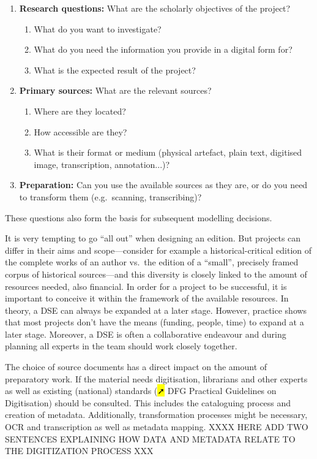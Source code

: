 \documentclass[
  letterpaper,
  DIV=11,
  numbers=noendperiod]{scrreprt}
\begin{document}
\begin{enumerate}
\def\labelenumi{\arabic{enumi}.}
\item
  \textbf{Research questions:} What are the scholarly objectives of the
  project?

  \begin{enumerate}
  \def\labelenumii{\alph{enumii}.}
  \item
    What do you want to investigate?
  \item
    What do you need the information you provide in a digital form for?
  \item
    What is the expected result of the project?
  \end{enumerate}
\item
  \textbf{Primary sources:} What are the relevant sources?

  \begin{enumerate}
  \def\labelenumii{\alph{enumii}.}
  \item
    Where are they located?
  \item
    How accessible are they?
  \item
    What is their format or medium (physical artefact, plain text,
    digitised image, transcription, annotation...)?
  \end{enumerate}
\item
  \textbf{Preparation:} Can you use the available sources as they are,
  or do you need to transform them (e.g.~scanning, transcribing)?
\end{enumerate}

These questions also form the basis for subsequent modelling decisions.

It is very tempting to go ``all out'' when designing an edition. But
projects can differ in their aims and scope---consider for example a
historical-critical edition of the complete works of an author vs.~the
edition of a ``small'', precisely framed corpus of historical
sources---and this diversity is closely linked to the amount of
resources needed, also financial. In order for a project to be
successful, it is important to conceive it within the framework of the
available resources. In theory, a DSE can always be expanded at a later
stage. However, practice shows that most projects don't have the means
(funding, people, time) to expand at a later stage. Moreover, a DSE is
often a collaborative endeavour and during planning all experts in the
team should work closely together.

The choice of source documents has a direct impact on the amount of
preparatory work. If the material needs digitisation, librarians and
other experts as well as existing (national) standards (\hl{➚} DFG
Practical Guidelines on Digitisation) should be consulted. This includes
the cataloguing process and creation of metadata. Additionally,
transformation processes might be necessary, OCR and transcription as
well as metadata mapping. XXXX HERE ADD TWO SENTENCES EXPLAINING HOW
DATA AND METADATA RELATE TO THE DIGITIZATION PROCESS XXX
\end{document}
